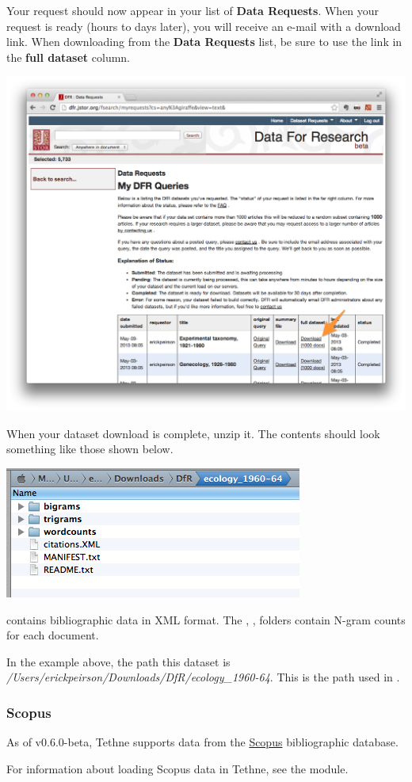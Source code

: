 \documentclass[letterpaper,10pt,english]{sphinxmanual}
\begin{document}
Your request should now appear in your list of \textbf{Data Requests}. When your request is
ready (hours to days later), you will receive an e-mail with a download link. When
downloading from the \textbf{Data Requests} list, be sure to use the link in the
\textbf{full dataset} column.

\includegraphics[width=0.600\linewidth]{getting.7.png}

When your dataset download is complete, unzip it. The contents should look something like
those shown below.

\includegraphics[width=0.400\linewidth]{getting.8.png}

 contains bibliographic data in XML format. The , ,
 folders contain N-gram counts for each document.

In the example above, the path this dataset is
\emph{/Users/erickpeirson/Downloads/DfR/ecology\_1960-64}. This is the path used in
{\hyperref[tethne.readers.dfr:tethne.readers.dfr.read]{}} .


\subsubsection{Scopus}
\label{tutorial.getting_data:scopus}
As of v0.6.0-beta, Tethne supports data from the \href{http://www.elsevier.com/online-tools/scopus}{Scopus} bibliographic database.

For information about loading Scopus data in Tethne, see the {\hyperref[tethne.readers.scopus:module-tethne.readers.scopus]{}}
module.
\end{document}
